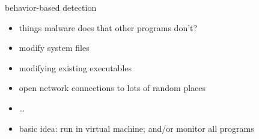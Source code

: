 \begin{frame}{behavior-based detection}
    \begin{itemize}
    \item things malware does that other programs don't?
    \vspace{.5cm}
    \item<2-> modify system files
    \item<2-> modifying existing executables
    \item<2-> open network connections to lots of random places 
    \item<2-> \ldots
    \vspace{.5cm}
    \item basic idea: run in virtual machine; and/or monitor all programs
    \end{itemize}
\end{frame}
